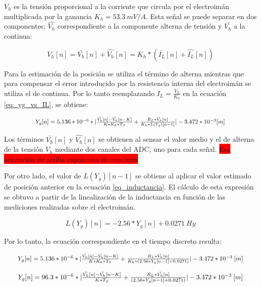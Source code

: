 $V_h$ es la tensión proporcional a la corriente que circula por el electroimán multiplicada por la ganancia $K_h=53.3\:mV/A$. Esta señal se puede separar en dos componentes: $\hat{V_h}$  correspondiente a la componente alterna de tensión y $\bar{V_h}$ a la continua:


\begin{equation} 
	V_h[n] = \bar{V_h}[n] + \hat{V_h}[n] = K_h * (\bar{I_L}[n] + \hat{I_L}[n])
\end{equation}

 Para la estimación de la posición se utiliza el término de alterna mientras que para compensar el error introducido por la resistencia interna del electroimán se utiliza el de continua. Por lo tanto reemplazando $I_L=\frac{V_h}{K_h}$ en la ecuación \ref{eq_yg_vs_IL}, se obtiene:

\begin{equation}
	\resizebox{.8\hsize}{!}
	{
	$Y_g[n] = 5.136*10^{-6}*|\frac{\hat{V_h}[n]-\hat{V_h}[n-K]}{K*K_h*T_S} + \frac{R_L*\bar{V_h}[n]}{K_h*L(Y_g)[n-1]}|-3.472*10^{-3}[m]$
	}
\end{equation}

Los términos $\bar{V_h}[n]$ y $\hat{V_h}[n]$ se obtienen al sensar el valor medio y el de alterna de la tensión $V_h$ mediante dos canales del ADC, uno para cada señal.
\colorbox{red}{Esa aclaración de arriba capaz esta de mas?mm}

Por otro lado, el valor de $L(Y_g)[n-1]$ se obtiene al aplicar el valor estimado de posición anterior en la ecuación \ref{eq_inductancia}. El cálculo de esta expresión se obtuvo a partir de la linealización de la inductancia en función de las mediciones realizadas sobre el electroimán.


\begin{equation} \label{eq_inductancia}
	L(Y_g)[n] = -2.56*Y_g[n]+0.0271\:Hy
\end{equation}

 Por lo tanto, la ecuación correspondiente en el tiempo discreto resulta:

\begin{equation*}
	\resizebox{.95\hsize}{!}
	{
	$Y_g[n] = 5.136*10^{-6}*|\frac{\hat{V_h}[n]-\hat{V_h}[n-K]}{K*K_h*T_S} + \frac{R_L*\bar{V_h}[n]}{K_h*(2.56*Y_g[n-1]+0.0271)}|-3.472*10^{-3}\:[m]$
	}
\end{equation*}

\begin{equation*}
	\resizebox{.95\hsize}{!}
	{
	$
	Y_g[n] = 96.3*10^{-6}*|\frac{\hat{V_h}[n]-\hat{V_h}[n-K]}{K*T_S} + \frac{R_L*\bar{V_h}[n]}{(2.56*Y_g[n-1]+0.0271)}|-3.472*10^{-3}\:[m]
	$
	}
\end{equation*}


